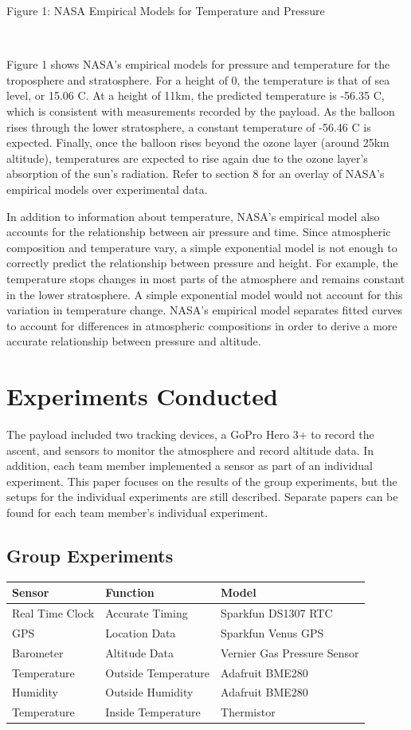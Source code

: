 \documentclass[12pt,]{article}
\begin{document}
Figure 1: NASA Empirical Models for Temperature and Pressure

~

Figure 1 shows NASA's empirical models for pressure and temperature for
the troposphere and stratosphere. For a height of 0, the temperature is
that of sea level, or 15.06 \degree C. At a height of 11km, the
predicted temperature is -56.35 \degree C, which is consistent with
measurements recorded by the payload. As the balloon rises through the
lower stratosphere, a constant temperature of -56.46 \degree C is
expected. Finally, once the balloon rises beyond the ozone layer (around
25km altitude), temperatures are expected to rise again due to the ozone
layer's absorption of the sun's radiation. Refer to section 8 for an
overlay of NASA's empirical models over experimental data.

In addition to information about temperature, NASA's empirical model
also accounts for the relationship between air pressure and time. Since
atmospheric composition and temperature vary, a simple exponential model
is not enough to correctly predict the relationship between pressure and
height. For example, the temperature stops changes in most parts of the
atmosphere and remains constant in the lower stratosphere. A simple
exponential model would not account for this variation in temperature
change. NASA's empirical model separates fitted curves to account for
differences in atmospheric compositions in order to derive a more
accurate relationship between pressure and altitude.

\section{Experiments Conducted}\label{experiments-conducted}

The payload included two tracking devices, a GoPro Hero 3+ to record the
ascent, and sensors to monitor the atmosphere and record altitude data.
In addition, each team member implemented a sensor as part of an
individual experiment. This paper focuses on the results of the group
experiments, but the setups for the individual experiments are still
described. Separate papers can be found for each team member's
individual experiment.

\subsection{Group Experiments}\label{group-experiments}

\begin{longtable}[]{@{}lll@{}}
\toprule
Sensor & Function & Model\tabularnewline
\midrule
\endhead
Real Time Clock & Accurate Timing & Sparkfun DS1307 RTC\tabularnewline
GPS & Location Data & Sparkfun Venus GPS\tabularnewline
Barometer & Altitude Data & Vernier Gas Pressure Sensor\tabularnewline
Temperature & Outside Temperature & Adafruit BME280\tabularnewline
Humidity & Outside Humidity & Adafruit BME280\tabularnewline
Temperature & Inside Temperature & Thermistor\tabularnewline
\bottomrule
\end{longtable}
\end{document}
